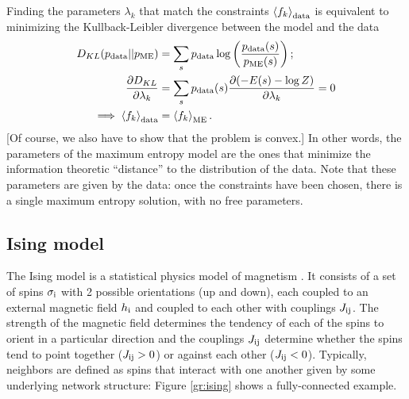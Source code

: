 \documentclass[aps,prl,twocolumn,nofootinbib]{revtex4-1}
\begin{document}
Finding the parameters $\lambda_k$ that match the constraints $\left<f_k\right>_{\rm data}$ is equivalent to minimizing the Kullback-Leibler divergence between the model and the data \cite{Cover:2006tl}
\begin{align}
	D_{KL}(p_{\rm data}||p_{\rm ME}) &= \sum_s p_{\rm data} \log\left(\frac{p_{\rm data}(s)}{p_{\rm ME}(s)}\right);\\
	\frac{\partial D_{KL}}{\partial \lambda_k} &= \sum_s p_{\rm data}(s) \frac{\partial (-E(s)-\log Z)}{\partial \lambda_k} = 0 \nonumber \\
	\implies  \left<f_k\right>_{\rm data} &= \left<f_k\right>_{\rm ME}\label{eq:fk-fk}.
\end{align}
[Of course, we also have to show that the problem is convex.] In other words, the parameters of the maximum entropy model are the ones that minimize the information theoretic ``distance'' to the distribution of the data. Note that these parameters are given by the data: once the constraints have been chosen, there is a single maximum entropy solution, with no free parameters.

\subsection{Ising model}
The Ising model is a statistical physics model of magnetism \cite{Ising:1924vf}. It consists of a set of spins $\sigma_{\rm i}$ with 2 possible orientations (up and down), each coupled to an external magnetic field $h_{\rm i}$ and coupled to each other with couplings $J_{\rm ij}$. The strength of the magnetic field determines the tendency of each of the spins to orient in a particular direction and the couplings $J_{\rm ij}$ determine whether the spins tend to point together ($J_{\rm ij}>0$) or against each other ($J_{\rm ij}<0$). Typically, neighbors are defined as spins that interact with one another given by some underlying network structure: Figure \ref{gr:ising} shows a fully-connected example.
\end{document}
